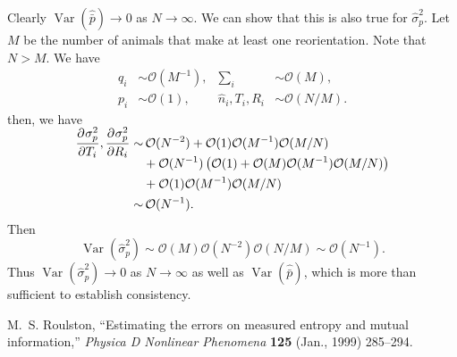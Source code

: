 \documentclass[12pt]{article}
\newcommand{\pdiff}[3][\rule{0mm}{0mm}]{\frac{\partial^{#1} #2}{\partial {#3}^{#1}}}
\newcommand{\CO}{\mathcal{O}}
\DeclareMathOperator{\var}{Var}
\newcommand{\prn}[1]{\left ( #1 \right )}
\begin{document}
Clearly $\var(\hat{\bar{p}})\to0$ as $N\to\infty$. We can show that this is also true for $\hat{\sigma}_p^2$. Let $M$ be the number of animals that make at least one reorientation. Note that $N>M$. We have
%
\begin{equation}\label{eq:orderNM}
  \begin{aligned}
    q_i &\sim \CO(M^{-1}),
    & \sum_i &\sim \CO(M), \\
    p_i &\sim \CO(1),
    & \hat{n}_i,T_i,R_i &\sim \CO(N/M).
  \end{aligned}
\end{equation}
%
then, we have
%
\begin{equation}\label{eq:coefforder}
  \begin{aligned}
    \smash{\pdiff{\sigma_p^2}{T_i},\pdiff{\sigma_p^2}{R_i}  } \sim&\,
    \CO(N^{-2}) + \CO(1)\CO(M^{-1})\CO(M/N) \\&+ \CO(N^{-1})\prn{\CO(1) + \CO(M)\CO(M^{-1})\CO(M/N)} \\&+ \CO(1)\CO(M^{-1})\CO(M/N)\\
      \sim&\, \CO(N^{-1}).
  \end{aligned}
\end{equation}
%
Then
%
\begin{equation}\label{eq:ordervarvarp}
  \var(\hat{\sigma}_p^2) \sim \CO(M)\CO(N^{-2})\CO(N/M) \sim \CO(N^{-1}).
\end{equation}
%
Thus $\var(\hat{\sigma}_p^2)\to0$ as $N\to\infty$ as well as $\var(\hat{\bar{p}})$, which is more than sufficient to establish consistency.












\providecommand{\href}[2]{#2}
\begingroup\raggedright
\begin{thebibliography}{1}

  M.~S. {Roulston},
  ``{Estimating the errors on measured entropy and mutual information},''
  \href{http://dx.doi.org/10.1016/S0167-2789(98)00269-3}{{\em Physica D Nonlinear Phenomena} {\bf 125} (Jan., 1999)  285--294}.

\end{thebibliography}
\endgroup
\end{document}
